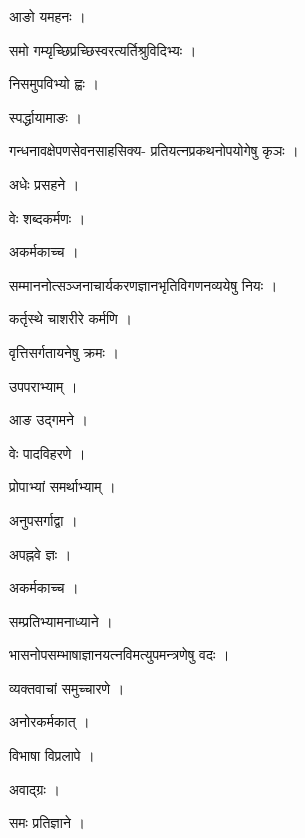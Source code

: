 \documentclass[10pt, openany]{book}
\begin{document}
\noindent आङो यमहनः ।

\noindent समो गम्यृच्छिप्रच्छिस्वरत्यर्तिश्रुविदिभ्यः ।

\noindent निसमुपविभ्यो ह्वः ।

\noindent स्पर्द्धायामाङः ।

\noindent गन्धनावक्षेपणसेवनसाहसिक्य- प्रतियत्नप्रकथनोपयोगेषु कृञः ।

\noindent अधेः प्रसहने ।

\noindent वेः शब्दकर्मणः ।

\noindent अकर्मकाच्च ।

\noindent सम्माननोत्सञ्जनाचार्यकरणज्ञानभृतिविगणनव्ययेषु नियः ।

\noindent कर्तृस्थे चाशरीरे कर्मणि ।

\noindent वृत्तिसर्गतायनेषु क्रमः ।

\noindent उपपराभ्याम् ।

\noindent आङ उद्गमने ।

\noindent वेः पादविहरणे ।

\noindent प्रोपाभ्यां समर्थाभ्याम् ।

\noindent अनुपसर्गाद्वा ।

\noindent अपह्नवे ज्ञः ।

\noindent अकर्मकाच्च ।

\noindent सम्प्रतिभ्यामनाध्याने ।

\noindent भासनोपसम्भाषाज्ञानयत्नविमत्युपमन्त्रणेषु वदः ।

\noindent व्यक्तवाचां समुच्चारणे ।

\noindent अनोरकर्मकात् ।

\noindent विभाषा विप्रलापे ।

\noindent अवाद्ग्रः ।

\noindent समः प्रतिज्ञाने ।
\end{document}
